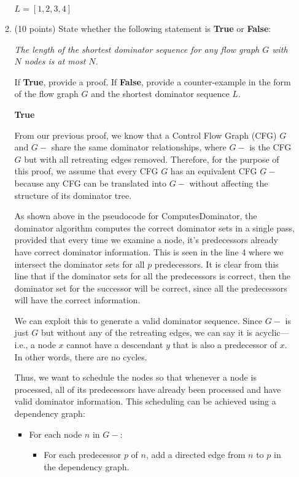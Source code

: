 \documentclass[12pt]{article}
\begin{document}
\begin{enumerate}
\begin{enumerate}
\begin{mdframed}
      $L = [1,2,3,4]$
    \end{mdframed}

    \item (10 points) State whether the following statement is \textbf{True}
    or \textbf{False}: 

      \emph{The length of the shortest dominator sequence for any flow graph
      $G$ with $N$ nodes is at most $N$.}

    If \textbf{True}, provide a proof. If \textbf{False}, provide a
    counter-example in the form of the flow graph $G$ and the shortest
    dominator sequence $L$.
    \begin{mdframed}
       \textbf{True}

From our previous proof, we know that a Control Flow Graph (CFG) $G$ and $G-$ share the same dominator relationships, where $G-$ is the CFG $G$ but with all retreating edges removed. Therefore, for the purpose of this proof, we assume that every CFG $G$ has an equivalent CFG $G-$ because any CFG can be translated into $G-$ without affecting the structure of its dominator tree.

   As shown above in the pseudocode for ComputesDominator, the dominator algorithm computes the correct dominator sets in a single pass, provided that every time we examine a node, it's predecessors already have correct dominator information. This is seen in the line 4 where we intersect the dominator sets for all $p$ predecessors. It is clear from this line that if the dominator sets for all the predecessors is correct, then the dominator set for the successor will be correct, since all the predecessors will have the correct information.

    We can exploit this to generate a valid dominator sequence. Since $G-$ is just $G$ but without any of the retreating edges, we can say it is acyclic—i.e., a node \( x \) cannot have a descendant \( y \) that is also a predecessor of \( x \). In other words, there are no cycles.

    Thus, we want to schedule the nodes so that whenever a node is processed, all of its predecessors have already been processed and have valid dominator information. This scheduling can be achieved using a dependency graph:

    \begin{itemize}
      \item For each node \( n \) in $G-$:
      \begin{itemize}
        \item For each predecessor \( p \) of \( n \), add a directed edge from \( n \) to \( p \) in the dependency graph.
      \end{itemize}
    \end{itemize}


\end{mdframed}
\end{enumerate}
\end{enumerate}
\end{document}
